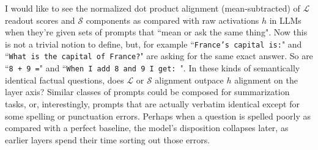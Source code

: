 \documentclass{article}
\newcommand{\jlens}{\mathscr{L}}
\newcommand{\jspace}{\mathscr{S}}
\begin{document}
I would like to see the normalized dot product alignment (mean-subtracted) of \(\jlens\) readout scores and \(\jspace\) components as compared with raw activations \(h\) in LLMs when they're given sets of prompts that ``mean or ask the same thing". Now this is not a trivial notion to define, but, for example ``\texttt{France's capital is:}" and ``\texttt{What is the capital of France?}" are asking for the same exact answer. So are ``\texttt{8 + 9 =}" and ``\texttt{When I add 8 and 9 I get: }". In these kinds of semantically identical factual questions, does \(\jlens\) or \(\jspace\) alignment outpace \(h\) alignment on the layer axis? Similar classes of prompts could be composed for summarization tasks, or, interestingly, prompts that are actually verbatim identical except for some spelling or punctuation errors. Perhaps when a question is spelled poorly as compared with a perfect baseline, the model's disposition collapses later, as earlier layers spend their time sorting out those errors. 

\end{document}
